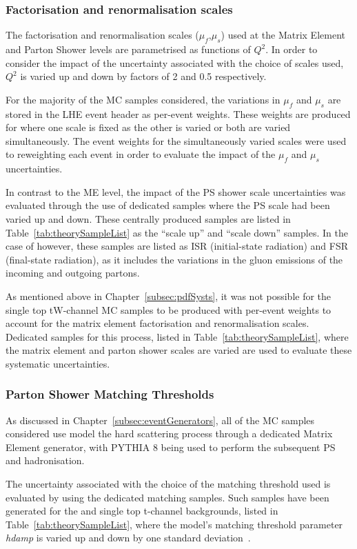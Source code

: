 \subsubsection{Factorisation and renormalisation scales}
The factorisation and renormalisation scales ($\mu_{f}$,$\mu_{s}$) used at the Matrix Element and Parton Shower levels are parametrised as functions of $Q^{2}$.
In order to consider the impact of the uncertainty associated with the choice of scales used, $Q^{2}$ is varied up and down by factors of 2 and 0.5 respectively.

For the majority of the MC samples considered, the variations in $\mu_{f}$ and $\mu_{s}$ are stored in the LHE event header as per-event weights.
These weights are produced for where one scale is fixed as the other is varied or both are varied simultaneously.
The event weights for the simultaneously varied scales were used to reweighting each event in order to evaluate the impact of the $\mu_{f}$ and $\mu_{s}$ uncertainties.

In contrast to the ME level, the impact of the PS shower scale uncertainties was evaluated through the use of dedicated samples where the PS scale had been varied up and down.
These centrally produced samples are listed in Table~\ref{tab:theorySampleList} as the ``scale up'' and ``scale down'' samples.
In the case of \ttbar however, these samples are listed as ISR (initial-state radiation) and FSR (final-state radiation), as it includes the variations in the gluon emissions of the incoming and outgoing partons.

As mentioned above in Chapter~\ref{subsec:pdfSysts}, it was not possible for the single top tW-channel MC samples to be produced with per-event weights to account for the matrix element factorisation and renormalisation scales.
Dedicated samples for this process, listed in Table~\ref{tab:theorySampleList}, where the matrix element and parton shower scales are varied are used to evaluate these systematic uncertainties.

\subsubsection{Parton Shower Matching Thresholds}
As discussed in Chapter~\ref{subsec:eventGenerators}, all of the MC samples considered use model the hard scattering process through a dedicated Matrix Element generator, with PYTHIA 8 being used to perform the subsequent PS and hadronisation.

The uncertainty associated with the choice of the matching threshold used is evaluated by using the dedicated matching samples.
Such samples have been generated for the \ttbar and single top t-channel backgrounds, listed in Table~\ref{tab:theorySampleList}, where the model's matching threshold parameter \emph{hdamp} is varied up and down by one standard deviation~\cite{CMS:2016kle}.

